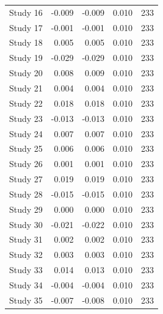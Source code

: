 \begin{table}[!h]
{\begin{tabular}[t]{rrrrr}
\hspace{1em}Study 16 & -0.009 & -0.009 & 0.010 & 233\\
\hspace{1em}Study 17 & -0.001 & -0.001 & 0.010 & 233\\
\hspace{1em}Study 18 & 0.005 & 0.005 & 0.010 & 233\\
\hspace{1em}Study 19 & -0.029 & -0.029 & 0.010 & 233\\
\hspace{1em}Study 20 & 0.008 & 0.009 & 0.010 & 233\\
\hspace{1em}Study 21 & 0.004 & 0.004 & 0.010 & 233\\
\hspace{1em}Study 22 & 0.018 & 0.018 & 0.010 & 233\\
\hspace{1em}Study 23 & -0.013 & -0.013 & 0.010 & 233\\
\hspace{1em}Study 24 & 0.007 & 0.007 & 0.010 & 233\\
\hspace{1em}Study 25 & 0.006 & 0.006 & 0.010 & 233\\
\hspace{1em}Study 26 & 0.001 & 0.001 & 0.010 & 233\\
\hspace{1em}Study 27 & 0.019 & 0.019 & 0.010 & 233\\
\hspace{1em}Study 28 & -0.015 & -0.015 & 0.010 & 233\\
\hspace{1em}Study 29 & 0.000 & 0.000 & 0.010 & 233\\
\hspace{1em}Study 30 & -0.021 & -0.022 & 0.010 & 233\\
\hspace{1em}Study 31 & 0.002 & 0.002 & 0.010 & 233\\
\hspace{1em}Study 32 & 0.003 & 0.003 & 0.010 & 233\\
\hspace{1em}Study 33 & 0.014 & 0.013 & 0.010 & 233\\
\hspace{1em}Study 34 & -0.004 & -0.004 & 0.010 & 233\\
\hspace{1em}Study 35 & -0.007 & -0.008 & 0.010 & 233\\

\end{tabular}}
\end{table}
